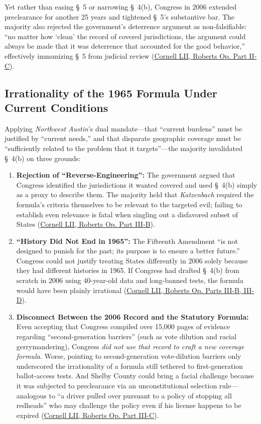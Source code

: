 \documentclass[12pt]{article}
\begin{document}
Yet rather than easing \S~5 or narrowing \S~4(b), Congress in 2006 extended preclearance for another 25 years and tightened \S~5's substantive bar. The majority also rejected the government's deterrence argument as non-falsifiable: ``no matter how `clean' the record of covered jurisdictions, the argument could always be made that it was deterrence that accounted for the good behavior,'' effectively immunizing \S~5 from judicial review (\href{https://www.law.cornell.edu/supremecourt/text/12-96}{Cornell LII, Roberts Op. Part II-C}).

\subsection{Irrationality of the 1965 Formula Under Current Conditions}
Applying \emph{Northwest Austin}'s dual mandate---that ``current burdens'' must be justified by ``current needs,'' and that disparate geographic coverage must be ``sufficiently related to the problem that it targets''---the majority invalidated \S~4(b) on three grounds:
\begin{enumerate}
    \item \textbf{Rejection of ``Reverse-Engineering'':} The government argued that Congress identified the jurisdictions it wanted covered and used \S~4(b) simply as a proxy to describe them. The majority held that \emph{Katzenbach} required the formula's criteria themselves to be relevant to the targeted evil; failing to establish even relevance is fatal when singling out a disfavored subset of States (\href{https://www.law.cornell.edu/supremecourt/text/12-96}{Cornell LII, Roberts Op. Part III-B}).
    \item \textbf{``History Did Not End in 1965'':} The Fifteenth Amendment ``is not designed to punish for the past; its purpose is to ensure a better future.'' Congress could not justify treating States differently in 2006 solely because they had different histories in 1965. If Congress had drafted \S~4(b) from scratch in 2006 using 40-year-old data and long-banned tests, the formula would have been plainly irrational (\href{https://www.law.cornell.edu/supremecourt/text/12-96}{Cornell LII, Roberts Op. Parts III-B, III-D}).
    \item \textbf{Disconnect Between the 2006 Record and the Statutory Formula:} Even accepting that Congress compiled over 15,000 pages of evidence regarding ``second-generation barriers'' (such as vote dilution and racial gerrymandering), Congress \emph{did not use that record to craft a new coverage formula}. Worse, pointing to second-generation vote-dilution barriers only underscored the irrationality of a formula still tethered to first-generation ballot-access tests. And Shelby County could bring a facial challenge because it was subjected to preclearance via an unconstitutional selection rule---analogous to ``a driver pulled over pursuant to a policy of stopping all redheads'' who may challenge the policy even if his license happens to be expired (\href{https://www.law.cornell.edu/supremecourt/text/12-96}{Cornell LII, Roberts Op. Part III-C}).
\end{enumerate}
\end{document}
